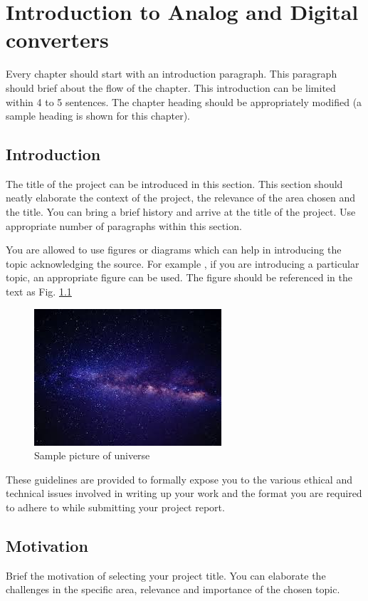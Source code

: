 \chapter{Introduction to Analog and Digital converters}
Every chapter should start with an introduction paragraph. This paragraph should brief about the flow of the chapter. This introduction can be limited within 4 to 5 sentences. The chapter heading should be appropriately modified (a sample heading is shown for this chapter).
\section[Introduction]{\textbf{Introduction}}
The title of the project can be introduced in this section. This section should neatly elaborate the context of the project, the relevance of the area chosen and the title. You can bring a brief history and arrive at the title of the project. Use appropriate number of
paragraphs within this section. 

You are allowed to use figures or diagrams which can help in introducing the topic acknowledging the source. For example , if you are introducing a particular topic, an appropriate figure can be used. The figure should be referenced in the text as Fig. \ref{fig:universe} 
\begin{figure}[htb]
\centering
	\includegraphics[scale=1]{Figures/universe}	
	\caption{Sample picture of universe }
	\label{fig:universe}
\end{figure}

These guidelines are provided to formally expose you to the various ethical and technical issues involved in writing up your work and the format you are required to adhere to while submitting your project report.

\section[Motivation]{\textbf{Motivation}}

Brief the motivation of selecting your project title. You can elaborate the challenges in the specific area, relevance and importance of the chosen topic. 


